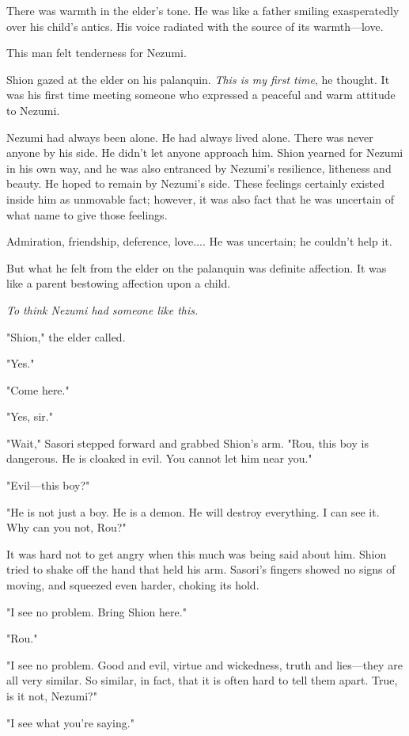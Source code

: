 There was warmth in the elder's tone. He was like a father smiling
exasperatedly over his child's antics. His voice radiated with the
source of its warmth---love.

This man felt tenderness for Nezumi.

Shion gazed at the elder on his palanquin. \emph{This is my first time}, he
thought. It was his first time meeting someone who expressed a peaceful
and warm attitude to Nezumi.

Nezumi had always been alone. He had always lived alone. There was never
anyone by his side. He didn't let anyone approach him. Shion yearned for
Nezumi in his own way, and he was also entranced by Nezumi's resilience,
litheness and beauty. He hoped to remain by Nezumi's side. These
feelings certainly existed inside him as unmovable fact; however, it was
also fact that he was uncertain of what name to give those feelings.

Admiration, friendship, deference, love.... He was uncertain; he
couldn't help it.

But what he felt from the elder on the palanquin was definite affection.
It was like a parent bestowing affection upon a child.

\emph{To think Nezumi had someone like this.}

"Shion," the elder called.

"Yes."

"Come here."

"Yes, sir."

"Wait," Sasori stepped forward and grabbed Shion's arm. "Rou, this boy
is dangerous. He is cloaked in evil. You cannot let him near you."

"Evil---this boy?"

"He is not just a boy. He is a demon. He will destroy everything. I can
see it. Why can you not, Rou?"

It was hard not to get angry when this much was being said about him.
Shion tried to shake off the hand that held his arm. Sasori's fingers
showed no signs of moving, and squeezed even harder, choking its hold.

"I see no problem. Bring Shion here."

"Rou."

"I see no problem. Good and evil, virtue and wickedness, truth and
lies---they are all very similar. So similar, in fact, that it is often
hard to tell them apart. True, is it not, Nezumi?"

"I see what you're saying."

